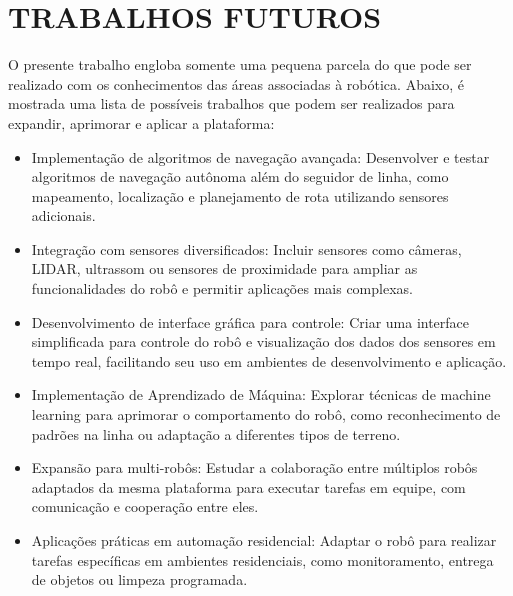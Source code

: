 \chapter{TRABALHOS FUTUROS}
O presente trabalho engloba somente uma pequena parcela do que pode ser realizado com os conhecimentos das áreas associadas à robótica. Abaixo, é mostrada uma lista de possíveis trabalhos que podem ser realizados para expandir, aprimorar e aplicar a plataforma:


\begin{itemize}
    \item Implementação de algoritmos de navegação avançada: Desenvolver e testar algoritmos de navegação autônoma além do seguidor de linha, como mapeamento, localização e planejamento de rota utilizando sensores adicionais.

    \item Integração com sensores diversificados: Incluir sensores como câmeras, LIDAR, ultrassom ou sensores de proximidade para ampliar as funcionalidades do robô e permitir aplicações mais complexas.
    
    \item Desenvolvimento de interface gráfica para controle: Criar uma interface simplificada para controle do robô e visualização dos dados dos sensores em tempo real, facilitando seu uso em ambientes de desenvolvimento e aplicação.
    
    \item Implementação de Aprendizado de Máquina: Explorar técnicas de machine learning para aprimorar o comportamento do robô, como reconhecimento de padrões na linha ou adaptação a diferentes tipos de terreno.
    
    \item Expansão para multi-robôs: Estudar a colaboração entre múltiplos robôs adaptados da mesma plataforma para executar tarefas em equipe, com comunicação e cooperação entre eles.
    
    \item Aplicações práticas em automação residencial: Adaptar o robô para realizar tarefas específicas em ambientes residenciais, como monitoramento, entrega de objetos ou limpeza programada.
\end{itemize}